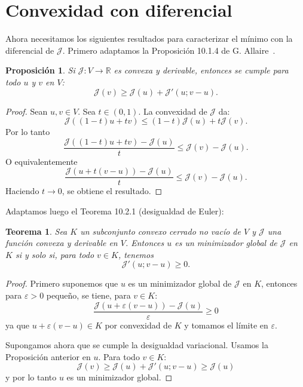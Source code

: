 \documentclass[12pt]{book}
\newtheorem{theorem}{Teorema}
\newtheorem{proposition}{Proposición}
\theoremstyle{definition}
\theoremstyle{plain}
\theoremstyle{remark}
\begin{document}

\section{Convexidad con diferencial}


\noindent Ahora necesitamos los siguientes resultados para caracterizar el mínimo con la diferencial de $\mathcal{J}$. Primero adaptamos la Proposición 10.1.4 de G. Allaire~\cite{allaire2007}.

\begin{proposition}
    Si $\mathcal{J} : V \rightarrow \mathbb{R}$ es convexa y derivable, entonces se cumple para todo $u$ y $v$ en $V$:
    \[
    \mathcal{J}(v) \geq \mathcal{J}(u) + \mathcal{J}'(u;v-u).
    \]
\end{proposition}

\begin{proof}
Sean $u, v \in V$. Sea $t \in (0,1)$. La convexidad de $\mathcal{J}$ da:
\[
\mathcal{J}((1-t) u + t v) \leq (1-t) \mathcal{J}(u) + t \mathcal{J}(v).
\]
Por lo tanto
\[
\frac{\mathcal{J}((1-t) u + t v) - \mathcal{J}(u)}{t} \leq \mathcal{J}(v) - \mathcal{J}(u).
\]
O equivalentemente
\[
\frac{\mathcal{J}(u + t (v - u)) - \mathcal{J}(u)}{t} \leq \mathcal{J}(v) - \mathcal{J}(u).
\]
Haciendo $t \to 0$, se obtiene el resultado.
\end{proof}

\medskip

\noindent Adaptamos luego el Teorema 10.2.1 (desigualdad de Euler):

\begin{theorem}
    Sea $K$  un subconjunto convexo cerrado no vacío de $V$ y $\mathcal{J}$ una función convexa y derivable en $V$. Entonces $u$ es un minimizador global de $\mathcal{J}$ en $K$ si y solo si, para todo $v\in K$, tenemos
    \[
    \mathcal{J}'(u;v-u) \geq 0.
    \]
\end{theorem}

\begin{proof}
Primero suponemos que $u$ es un minimizador global de $\mathcal{J}$ en $K$, entonces para $\varepsilon > 0$ pequeño, se tiene, para $v \in K$:
\[
\frac{\mathcal{J}(u+\varepsilon (v-u)) - \mathcal{J}(u)}{\varepsilon} \geq 0
\]
ya que $u+\varepsilon (v-u) \in K$ por convexidad de $K$ y tomamos el límite en $\varepsilon$.

Supongamos ahora que se cumple la desigualdad variacional. Usamos la Proposición anterior en $u$. Para todo $v \in K$:
\[
\mathcal{J}(v) \geq \mathcal{J}(u) + \mathcal{J}'(u;v-u) \geq \mathcal{J}(u)
\]
y por lo tanto $u$ es un minimizador global.
\end{proof}
\end{document}
